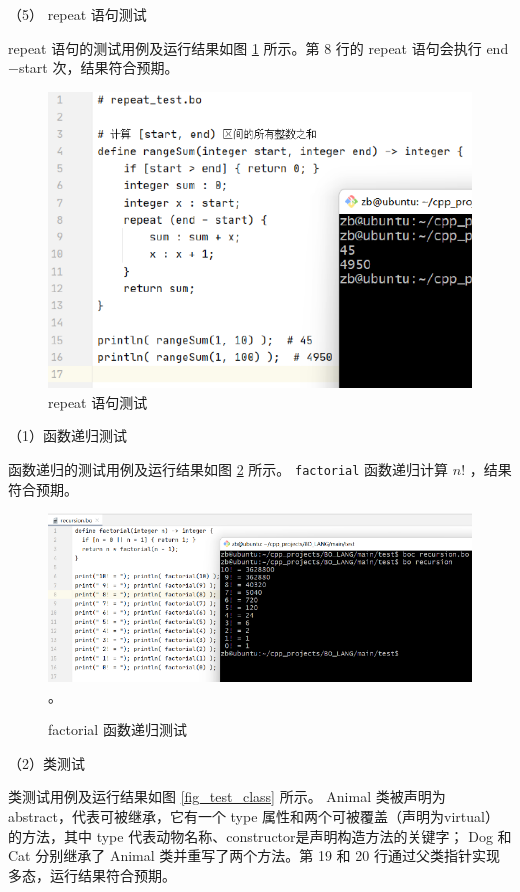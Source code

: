 （5） repeat 语句测试

repeat 语句的测试用例及运行结果如图 \ref{fig_test_repeat} 所示。第 8 行的 repeat 语句会执行 end$-$start 次，结果符合预期。

\begin{figure}[H]
    \centering\includegraphics{figure/test_repeat.pdf}
    \caption{repeat 语句测试}
    \label{fig_test_repeat}
\end{figure}


（1）函数递归测试

函数递归的测试用例及运行结果如图 \ref{fig_test_recur} 所示。 \verb!factorial! 函数递归计算 $n!$ ，结果符合预期。

\begin{figure}[H]
    \centering\includegraphics{figure/test_recursion.pdf} 。
    \caption{factorial 函数递归测试}
    \label{fig_test_recur}
\end{figure}

（2）类测试

类测试用例及运行结果如图 \ref{fig_test_class} 所示。 Animal 类被声明为 abstract，代表可被继承，它有一个 type 属性和两个可被覆盖（声明为virtual）的方法，其中 type 代表动物名称、constructor是声明构造方法的关键字； Dog 和 Cat 分别继承了 Animal 类并重写了两个方法。第 19 和 20 行通过父类指针实现多态，运行结果符合预期。

